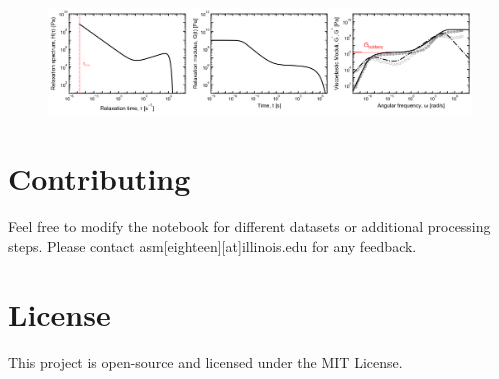 \documentclass[a4paper, 12pt]{article}
\begin{document}
\begin{itemize}
\begin{figure}[htbp]
    \centering
    \includegraphics[width=0.99\linewidth]{model_data_figure.png}
    \label{fig:model_data}
\end{figure}
\end{itemize}

\section*{Contributing}

Feel free to modify the notebook for different datasets or additional
processing steps. Please contact asm{[}eighteen{]}{[}at{]}illinois.edu
for any feedback.

\section*{License}

This project is open-source and licensed under the MIT License.
\end{document}
